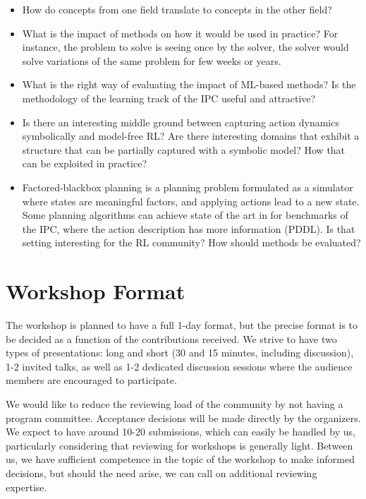 \documentclass[10pt]{article}
\begin{document}
\begin{itemize}
\item How do concepts from one field translate to concepts in the other field?
%
%
\item What is the impact of methods on how it would be used in practice? For
instance, the problem to solve is seeing once by the solver, the solver would
solve variations of the same problem for few weeks or years. 
%
\item What is the right way of evaluating the impact of ML-based methods? Is the
methodology of the learning track of the IPC useful and attractive?
%
\item Is there an interesting middle ground between capturing action dynamics
symbolically and model-free RL? Are there interesting domains that exhibit a
structure that can be partially captured with a symbolic model? How that can be
exploited in practice?
%
\item Factored-blackbox planning is a planning problem formulated as a simulator
where states are meaningful factors, and applying actions lead to a new state.
Some planning algorithms can achieve state of the art in for benchmarks of the
IPC, where the action description has more information (PDDL). Is that setting
interesting for the RL community? How should methods be evaluated?
\end{itemize}

\section*{Workshop Format}

The workshop is planned to have a full 1-day format, but the precise format is
to be decided as a function of the contributions received. We strive to have two
types of presentations: long and short (30 and 15 minutes, including
discussion), 1-2 invited talks, as well as 1-2 dedicated discussion sessions
where the audience members are encouraged to participate.

We would like to reduce the reviewing load of the community by not having a
program committee. Acceptance decisions will be made directly by the organizers.
We expect to have around 10-20 submissions, which can easily be handled by us,
particularly considering that reviewing for workshops is generally light.
Between us, we have sufficient competence in the topic of the workshop to make
informed decisions, but should the need arise, we can call on additional
reviewing expertise.
\end{document}
